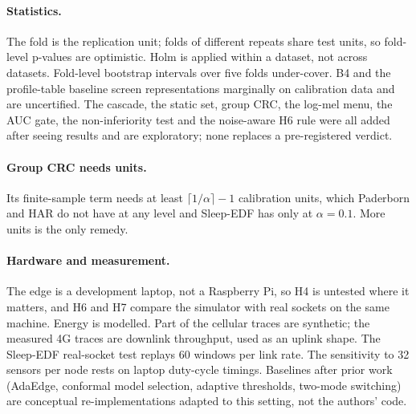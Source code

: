 \paragraph{Statistics.} The fold is the replication unit; folds of different repeats share test
units, so fold-level p-values are optimistic. Holm is applied within a dataset, not across
datasets. Fold-level bootstrap intervals over five folds under-cover. B4 and the profile-table
baseline screen representations marginally on calibration data and are uncertified. The cascade,
the static set, group CRC, the log-mel menu, the AUC gate, the non-inferiority test and the
noise-aware H6 rule were all added after seeing results and are exploratory; none replaces a
pre-registered verdict.

\paragraph{Group CRC needs units.} Its finite-sample term needs at least $\lceil 1/\alpha\rceil-1$
calibration units, which Paderborn and HAR do not have at any level and Sleep-EDF has only at
$\alpha = 0.1$. More units is the only remedy.

\paragraph{Hardware and measurement.} The edge is a development laptop, not a Raspberry Pi, so H4
is untested where it matters, and H6 and H7 compare the simulator with real sockets on the same
machine. Energy is modelled. Part of the cellular traces are synthetic; the measured 4G traces are
downlink throughput, used as an uplink shape. The Sleep-EDF real-socket test replays 60
windows per link rate. The sensitivity to 32 sensors per node rests on laptop duty-cycle timings.
Baselines after prior work (AdaEdge, conformal model selection, adaptive thresholds, two-mode
switching) are conceptual re-implementations adapted to this setting, not the authors' code.
